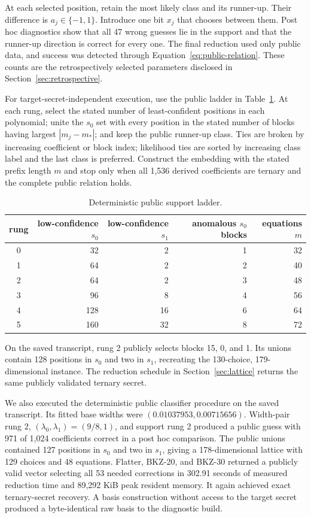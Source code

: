 \documentclass[11pt,a4paper]{article}
\begin{document}
At each selected position, retain the most likely class and its runner-up.
Their difference is $a_j\in\{-1,1\}$.  Introduce one bit $x_j$ that chooses
between them.  Post hoc diagnostics show that all 47 wrong guesses lie in the
support and that the runner-up direction is correct for every one.  The final
reduction used only public data, and success was detected through
Equation~\eqref{eq:public-relation}.  These counts are the retrospectively
selected parameters disclosed in Section~\ref{sec:retrospective}.

For target-secret-independent execution, use the public ladder in
Table~\ref{tab:ladder}.  At each rung, select the stated number of
least-confident positions in each polynomial; unite the $s_0$ set with every
position in the stated number of blocks having largest $|m_j-m_*|$; and keep
the public runner-up class.  Ties are broken by increasing coefficient or
block index; likelihood ties are sorted by increasing class label and the
last class is preferred.  Construct the embedding with the stated prefix
length $m$ and stop only when all 1,536 derived coefficients are ternary and
the complete public relation holds.

\begin{table}[ht]
\centering
\caption{Deterministic public support ladder.}
\label{tab:ladder}
\begin{tabular}{crrrr}
\toprule
rung & low-confidence $s_0$ & low-confidence $s_1$
     & anomalous $s_0$ blocks & equations $m$\\
\midrule
0 & 32  & 2  & 1 & 32\\
1 & 64  & 2  & 2 & 40\\
2 & 64  & 2  & 3 & 48\\
3 & 96  & 8  & 4 & 56\\
4 & 128 & 16 & 6 & 64\\
5 & 160 & 32 & 8 & 72\\
\bottomrule
\end{tabular}
\end{table}

On the saved transcript, rung 2 publicly selects blocks 15, 0, and 1.  Its
unions contain 128 positions in $s_0$ and two in $s_1$, recreating the
130-choice, 179-dimensional instance.  The reduction schedule in
Section~\ref{sec:lattice} returns the same publicly validated ternary secret.

We also executed the deterministic public classifier procedure on the saved
transcript.  Its fitted base widths were
$(0.01037953,0.00715656)$.  Width-pair rung 2,
$(\lambda_0,\lambda_1)=(9/8,1)$, and support rung 2 produced a public guess
with 971 of 1,024 coefficients correct in a post hoc comparison.  The public
unions contained 127 positions in $s_0$ and two in $s_1$, giving a
178-dimensional lattice with 129 choices and 48 equations.  Flatter,
BKZ-20, and BKZ-30 returned a publicly valid vector selecting all 53 needed
corrections in 302.91 seconds of measured reduction time and 89,292 KiB peak
resident memory.  It again achieved exact ternary-secret recovery.  A basis
construction without access to the target secret produced a byte-identical
raw basis to the diagnostic build.
\end{document}

